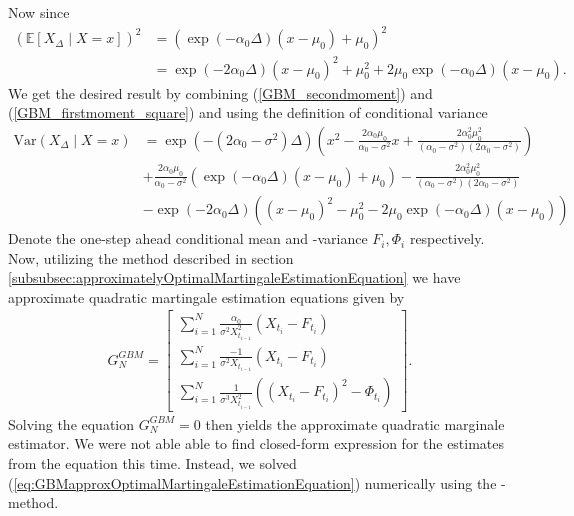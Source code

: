 Now since 
\begin{align}
    \left(\mathbb{E}\left[X_\Delta\middle|X=x\right]\right)^2 &= \left(\exp\left(-\alpha_0\Delta\right)\left(x-\mu_0\right) + \mu_0\right)^2 \nonumber\\
    &= \exp\left(-2\alpha_0\Delta\right)\left(x-\mu_0\right)^2 + \mu_0^2 + 2\mu_0\exp\left(-\alpha_0\Delta\right)\left(x-\mu_0\right). \label{GBM_firstmoment_square}
\end{align}
We get the desired result by combining (\ref{GBM_secondmoment}) and (\ref{GBM_firstmoment_square}) and using the definition of conditional variance
\begin{align}
    \mathrm{Var}\left(X_\Delta \middle| X = x\right) &= \exp\left(-\left(2\alpha_0 - \sigma^2\right)\Delta\right)\left(x^2 - \frac{2\alpha_0\mu_0}{\alpha_0-\sigma^2}x + \frac{2\alpha_0^2 \mu_0^2}{\left(\alpha_0-\sigma^2\right)\left(2\alpha_0 - \sigma^2\right)}\right) \nonumber \\
    &+ \frac{2\alpha_0\mu_0}{\alpha_0-\sigma^2}\left(\exp\left(-\alpha_0\Delta\right)\left(x-\mu_0\right) + \mu_0\right) - \frac{2\alpha_0^2\mu_0^2}{\left(\alpha_0-\sigma^2\right)\left(2\alpha_0 - \sigma^2\right)} \nonumber\\
    &- \exp\left(-2\alpha_0\Delta\right)\left(\left(x-\mu_0\right)^2 - \mu_0^2 - 2\mu_0\exp\left(-\alpha_0\Delta\right)\left(x-\mu_0\right)\right)
\end{align} 
Denote the one-step ahead conditional mean and -variance $F_i, \Phi_i$ respectively. Now, utilizing the method described in section \ref{subsubsec:approximatelyOptimalMartingaleEstimationEquation} we have approximate quadratic martingale estimation equations given by
\begin{align}
    G_N^{GBM} = \begin{bmatrix}
        \sum_{i = 1}^N \frac{\alpha_0}{\sigma^2 X_{t_{i-1}}^2}\left(X_{t_i} - F_{t_i}\right)\\
        \sum_{i = 1}^N \frac{-1}{\sigma^2 X_{t_{i-1}}}\left(X_{t_i} - F_{t_i}\right)\\
        \sum_{i = 1}^N \frac{1}{\sigma^3 X_{t_{i-1}}^2}\left(\left(X_{t_i} - F_{t_i}\right)^2 - \Phi_{t_i}\right)
    \end{bmatrix}. \label{eq:GBMapproxOptimalMartingaleEstimationEquation}
\end{align}
Solving the equation $G_N^{GBM} = 0$ then yields the approximate quadratic marginale estimator. We were not able able to find closed-form expression for the estimates from the equation this time. Instead, we solved (\ref{eq:GBMapproxOptimalMartingaleEstimationEquation}) numerically using the -method\cite{nleqslv}.
